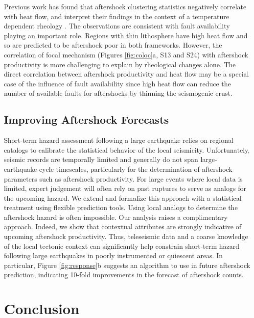 \documentclass[draft, jgrga]{agujournal2018}
\begin{document}
Previous work has found that aftershock clustering statistics negatively correlate with heat flow, and interpret their findings in the context of a temperature dependent rheology \citep{Ben-Zion2006AnalysisRheology, Zaliapin2016AClusters}. The observations are consistent with fault availability playing an important role. Regions with thin lithosphere have high heat flow and so are predicted to be aftershock poor in both frameworks. However, the correlation of focal mechanism (Figures \ref{fig:coloc}a, S13 and S24) with aftershock productivity is more challenging to explain by rheological changes alone. The direct correlation between aftershock productivity and heat flow may be a special case of the influence of fault availability since high heat flow can reduce the number of available faults for aftershocks by thinning the seismogenic crust.

\subsection{Improving Aftershock Forecasts}

Short-term hazard assessment following a large earthquake relies on regional catalogs to calibrate the statistical behavior of the local seismicity. Unfortunately, seismic records are temporally limited and generally do not span large-earthquake-cycle timescales, particularly for the determination of aftershock parameters such as aftershock productivity. For large events where local data is limited, expert judgement will often rely on past ruptures to serve as analogs for the upcoming hazard. We extend and formalize this approach with a statistical treatment using flexible prediction tools. Using local analogs to determine the aftershock hazard is often impossible. Our analysis raises a complimentary approach. Indeed, we show that contextual attributes are strongly indicative of upcoming aftershock productivity. Thus, teleseismic data and a coarse knowledge of the local tectonic context can significantly help constrain short-term hazard following large earthquakes in poorly instrumented or quiescent areas. In particular, Figure \ref{fig:response}b suggests an algorithm to use in future aftershock prediction, indicating 10-fold improvements in the forecast of aftershock counts.

\section{Conclusion}
\end{document}
